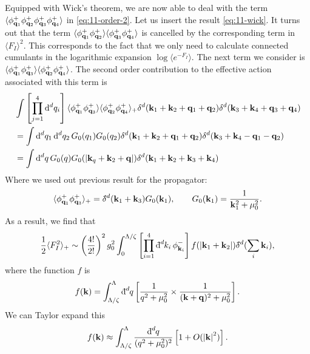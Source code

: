 Equipped with Wick's theorem, we are now able to deal with the term $\langle \phi^+_{\vb{q}_1} \phi^+_{\vb{q}_2}\phi^+_{\vb{q}_3}\phi^+_{\vb{q}_4} \rangle$ in \eqref{eq:11-order-2}.
Let us insert the result \eqref{eq:11-wick}. It turns out that the term $\langle \phi^+_{\vb{q}_1}\phi^+_{\vb{q}_2} \rangle \langle \phi^+_{\vb{q}_3}\phi^+_{\vb{q}_4} \rangle$ is cancelled by the corresponding term in $\langle F_I \rangle^2$. This corresponds to the fact that we only need to calculate connected cumulants in the logarithmic expansion $\log \langle e^{-F_I} \rangle$.
The next term we consider is $\langle \phi^+_{\vb{q}_1}\phi^+_{\vb{q}_3} \rangle \langle \phi^+_{\vb{q}_2}\phi^+_{\vb{q}_4} \rangle$. The second order contribution to the effective action associated with this term is
\begin{align}
  &\int \left[ \prod_{j=1}^4 \dd[d]{q_i} \right] \langle \phi^+_{\vb{q}_1}\phi^+_{\vb{q}_3} \rangle \langle \phi^+_{\vb{q}_2}\phi^+_{\vb{q}_4} \rangle_+ \delta^d (\vb{k}_1 + \vb{k}_2 + \vb{q}_1 + \vb{q}_2) \delta^d (\vb{k}_3 + \vb{k}_4 + \vb{q}_3 + \vb{q}_4) \\
		      &= \int \dd[d]{q_1} \dd[d]{q_2} G_0 (q_1) G_0(q_2) \delta^d (\vb{k}_1 + \vb{k}_2 + \vb{q}_1 + \vb{q}_2) \delta^d(\vb{k}_3 + \vb{k}_4 - \vb{q}_1 - \vb{q}_2) \\
		      &= \int \dd[d]{q} G_0(q) G_0(\abs{\vb{k}_q + \vb{k}_2 + \vb{q}}) \delta^d(\vb{k}_1 + \vb{k}_2 + \vb{k}_3 + \vb{k}_4)
\end{align}
Where we used out previous result for the propagator:
\begin{equation}
  \langle \phi^+_{\vb{q}_1} \phi^+_{\vb{q}_3} \rangle_+ = \bdelta^d(\vb{k}_1 + \vb{k}_3) G_0(\vb{k}_1), \qquad G_0(\vb{k}_1) = \frac{1}{\vb{k}_1^2 + \mu_0^2}.
\end{equation}
As a result, we find that
\begin{equation}
  \frac{1}{2} \langle F_I^2 \rangle_+ \sim \left( \frac{4!}{2!} \right)^2 g_0^2 \int_{0}^{\Lambda/\zeta} \left[ \prod_{i=1}^4 \bdd[d]{k_i} \phi_{\vb{k}_i}^- \right] f(\abs{\vb{k}_1 + \vb{k}_2}) \bdelta^d(\sum_i \vb{k}_i),
\end{equation}
where the function $f$ is
\begin{equation}
  f(\vb{k}) = \int_{\Lambda/\zeta}^{\Lambda}  \bdd[d]{q} \left[ \frac{1}{q^2 + \mu_0^2} \times \frac{1}{(\vb{k} + \vb{q})^2 + \mu_0^2} \right].
\end{equation}
We can Taylor expand this 
\begin{equation}
  f(\vb{k}) \approx \int_{\Lambda/\zeta}^{\Lambda} \frac{\bdd[d]{q}}{(q^2 + \mu_0^2)^2} \left[ 1 + O(\abs{\vb{k}}^2) \right].
\end{equation}

